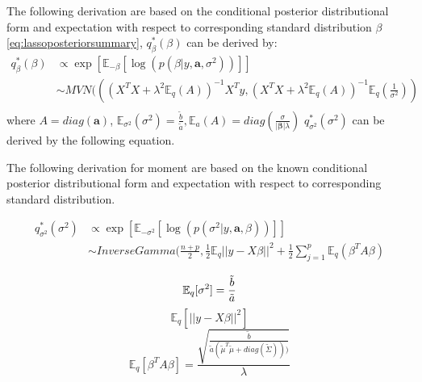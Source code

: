 The following derivation are based on the conditional posterior distributional form and expectation with respect to corresponding standard distribution
$\beta$  \autoref{eq:lassoposteriorsummary}, $q_{\beta}^{*}(\beta)$ can be derived by:
\begin{equation}
	\begin{aligned}
		q_{\beta}^{*}(\beta) & \propto \exp[\mathbb{E}_{-\beta}[\log(p(\beta|y,\mathbf{a},\sigma^2))]]\\
		& \sim MVN(((X^TX + \lambda^2\mathbb{E}_q(A))^{-1}X^Ty, (X^TX+\lambda^2\mathbb{E}_q(A))^{-1}\mathbb{E}_{q}(\frac{1}{\sigma^2}))\\
	\end{aligned}
\end{equation}
where $A = diag(\mathbf{a})$, $\mathbb{E}_{\sigma^2}(\sigma^2) = \frac{\tilde{b}}{\tilde{a}}, \mathbb{E}_a(A) = diag(\frac{\sigma}{|\mathbf{\beta}|\lambda})$
$q_{\sigma^2}^{*}(\sigma^2)$ can be derived by the following equation.




The following derivation for moment are based on the known conditional posterior distributional form and expectation with respect to corresponding standard distribution.







\begin{equation}
	\begin{aligned}
		q_{\sigma^2}^{*}(\sigma^2) & \propto \exp[\mathbb{E}_{-\sigma^2}[\log(p(\sigma^2|y,\mathbf{a},\beta))]]\\
		&\sim InverseGamma(\frac{n+p}{2}, \frac{1}{2} \mathbb{E}_q||y-X\beta||^2 + \frac{1}{2}\sum_{j=1}^p \mathbb{E}_q(\beta^TA\beta)
	\end{aligned}
\end{equation}

$$
	\mathbb{E}_{q}[\sigma^2] = \frac{\tilde{b}}{\tilde{a}}\\
$$
$$
\mathbb{E}_{q}[||y-X\beta||^2]
$$
$$
	\mathbb{E}_{q}[\beta^TA\beta] = \frac{\sqrt{\frac{\tilde{b}}{\tilde{a}(\tilde{\mu}^T \tilde{\mu} + diag(\tilde{\Sigma})))}}}{\lambda}
$$


